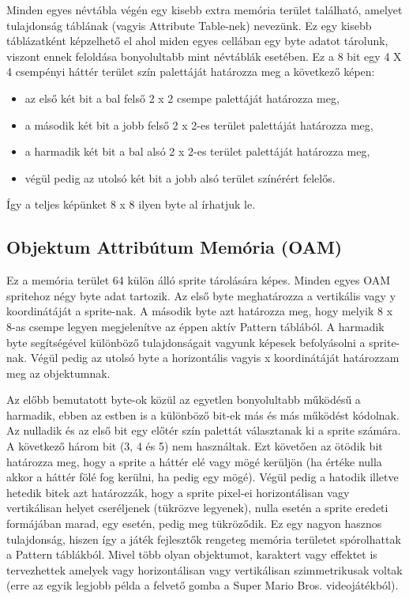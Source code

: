 	Minden egyes névtábla végén egy kisebb extra memória terület található, amelyet tulajdonság táblának (vagyis Attribute Table-nek) nevezünk. Ez egy kisebb táblázatként képzelhető el ahol miden egyes cellában egy byte adatot tárolunk, viszont ennek feloldása bonyolultabb mint névtáblák esetében. Ez a 8 bit egy 4 X 4 csempényi háttér terület szín palettáját határozza meg a következő képen:
	
	\begin{itemize}
		\item az első két bit a bal felső 2 x 2 csempe palettáját határozza meg, 
		\item a második két bit a jobb felső 2 x 2-es terület palettáját határozza meg, 
		\item a harmadik két bit a bal alsó 2 x 2-es terület palettáját határozza meg,
		\item végül pedig az utolsó két bit a jobb alsó terület színérért felelős.
	\end{itemize}
	
	 Így a teljes képünket 8 x 8 ilyen byte al írhatjuk le. 
 
 	 \subsection{Objektum Attribútum Memória (OAM)}
 	 Ez a memória terület 64 külön álló sprite tárolására képes. Minden egyes OAM spritehoz négy byte adat tartozik. Az első byte meghatározza a vertikális vagy y koordinátáját a sprite-nak. A második byte azt határozza meg, hogy melyik 8 x 8-as csempe legyen megjelenítve az éppen aktív Pattern táblából. A harmadik byte segítségével különböző tulajdonságait vagyunk képesek befolyásolni a sprite-nak. Végül pedig az utolsó byte a horizontális vagyis x koordinátáját határozzam meg az objektumnak.
 	 
 	 Az előbb bemutatott byte-ok közül az egyetlen bonyolultabb működésű a harmadik, ebben az estben is a különböző bit-ek más és más működést kódolnak.  Az nulladik és az első bit egy előtér szín palettát választanak ki a sprite számára. A következő három bit (3, 4 és 5) nem használtak. Ezt követően az ötödik bit határozza meg, hogy a sprite a háttér elé vagy mögé kerüljön (ha értéke nulla akkor a háttér fölé fog kerülni, ha pedig egy mögé). Végül pedig a hatodik illetve hetedik bitek azt határozzák, hogy a sprite pixel-ei horizontálisan vagy vertikálisan helyet cseréljenek (tükrözve legyenek), nulla esetén a sprite eredeti formájában marad, egy esetén, pedig meg tükröződik. Ez egy nagyon hasznos tulajdonság, hiszen így a játék fejlesztők rengeteg memória területet spórolhattak a Pattern táblákból. Mivel több olyan objektumot, karaktert vagy effektet is tervezhettek amelyek vagy horizontálisan vagy vertikálisan szimmetrikusak voltak (erre az egyik legjobb példa a felvető gomba  a Super Mario Bros. videojátékból).    
 	     
